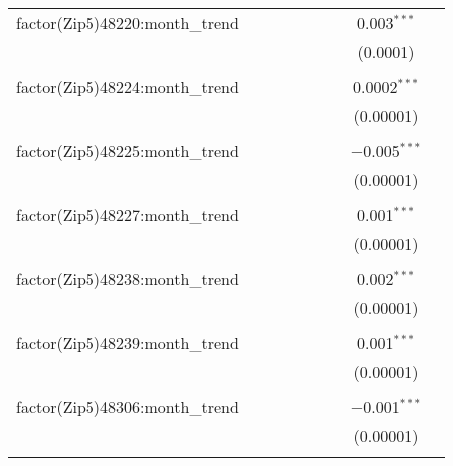 \begin{table}[H]
{\begin{tabular}{@{\extracolsep{5pt}}lcccccccc}
  factor(Zip5)48220:month\_trend &  &  &  &  &  &  & 0.003$^{***}$ &  \\  

   &  &  &  &  &  &  & (0.0001) &  \\  

   & & & & & & & & \\  

  factor(Zip5)48224:month\_trend &  &  &  &  &  &  & 0.0002$^{***}$ &  \\  

   &  &  &  &  &  &  & (0.00001) &  \\  

   & & & & & & & & \\  

  factor(Zip5)48225:month\_trend &  &  &  &  &  &  & $-$0.005$^{***}$ &  \\  

   &  &  &  &  &  &  & (0.00001) &  \\  

   & & & & & & & & \\  

  factor(Zip5)48227:month\_trend &  &  &  &  &  &  & 0.001$^{***}$ &  \\  

   &  &  &  &  &  &  & (0.00001) &  \\  

   & & & & & & & & \\  

  factor(Zip5)48238:month\_trend &  &  &  &  &  &  & 0.002$^{***}$ &  \\  

   &  &  &  &  &  &  & (0.00001) &  \\  

   & & & & & & & & \\  

  factor(Zip5)48239:month\_trend &  &  &  &  &  &  & 0.001$^{***}$ &  \\  

   &  &  &  &  &  &  & (0.00001) &  \\  

   & & & & & & & & \\  

  factor(Zip5)48306:month\_trend &  &  &  &  &  &  & $-$0.001$^{***}$ &  \\  

   &  &  &  &  &  &  & (0.00001) &  \\  

   & & & & & & & & \\  


\end{tabular}}
\end{table}
